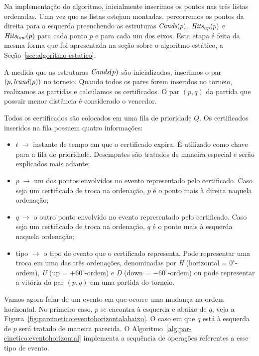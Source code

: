 Na implementação do algoritmo, inicialmente inserimos os pontos nas três listas ordenadas.
Uma vez que as listas estejam montadas, percorremos os pontos da direita para a esquerda
preenchendo as estruturas $\textit{Cands}(p)$, $\textit{Hits}_{up}(p)$ e $\textit{Hits}_{low}(p)$ para cada ponto $p$ e
para cada um dos eixos.
Esta etapa é feita da mesma forma que foi apresentada na seção sobre o algoritmo estático, a
Seção~\ref{sec:algoritmo-estatico}.

A medida que as estruturas $\textit{Cands}(p)$ são inicializadas, inserimos o par $(p, \textit{lcand}(p))$ no
torneio.
Quando todos os pares forem inseridos no torneio, realizamos as partidas e calculamos os
certificados.
O par $(p, q)$ da partida que possuir menor distância é considerado o vencedor.

Todos os certificados são colocados em uma fila de prioridade $Q$.
Os certificados inseridos na fila possuem quatro informações:
\begin{itemize}
    \item $t~\rightarrow$ instante de tempo em que o certificado
    expira.
    É utilizado como chave para a fila de prioridade.
    Desempates são tratados de maneira especial e serão explicados
    mais adiante;
    \item $p~\rightarrow$ um dos pontos envolvidos no evento
    representado pelo certificado.
    Caso seja um certificado de troca na ordenação, $p$ é o ponto mais à direita naquela ordenação;
    \item $q~\rightarrow$ o outro ponto envolvido no evento representado pelo certificado.
    Caso seja um certificado de troca na ordenação, $q$ é o ponto mais à esquerda naquela
    ordenação;
    \item tipo $ \rightarrow$ o tipo de evento que o certificado representa.
    Pode representar uma troca em uma das três ordenações, denominadas por \textit{H} (horizontal =
    $0^\circ$-ordem), \textit{U} (up = $+60^\circ$-ordem) e \textit{D} (down = $-60^\circ$-ordem) ou pode
    representar a vitória do par $(p, q)$ em uma partida do torneio.
\end{itemize}

Vamos agora falar de um evento em que ocorre uma mudança na ordem horizontal.
No primeiro caso, $p$ se encontra à esquerda e abaixo de $q$, veja a
Figura~\ref{fig:parcinetico:eventohorizontalabaixo}.
O caso em que $q$ está à esquerda de $p$ será tratado de maneira parecida.
O Algoritmo~\ref{alg:par-cinetico:eventohorizontal} implementa a sequência de operações referentes a
esse tipo de evento.

